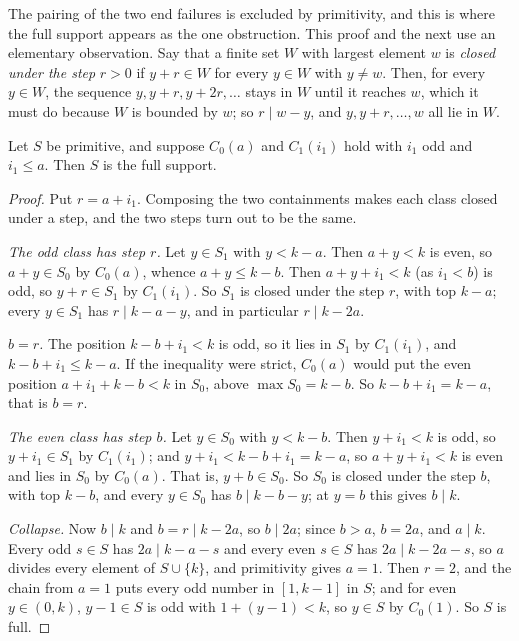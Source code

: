 The pairing of the two end failures is excluded by primitivity, and this is
where the full support appears as the one obstruction. This proof and the
next use an elementary observation. Say that a finite set $W$ with largest
element $w$ is \emph{closed under the step} $r>0$ if $y+r\in W$ for every
$y\in W$ with $y\ne w$. Then, for every $y\in W$, the sequence
$y,y+r,y+2r,\dots$ stays in $W$ until it reaches $w$, which it must do
because $W$ is bounded by $w$; so $r\mid w-y$, and $y,y+r,\dots,w$ all lie in
$W$.

\begin{lemma}
\label{lem:nao-endend}
Let $S$ be primitive, and suppose $C_0(a)$ and $C_1(i_1)$ hold with $i_1$
odd and $i_1\le a$. Then $S$ is the full support.
\end{lemma}

\begin{proof}
Put $r=a+i_1$. Composing the two containments makes each class closed under
a step, and the two steps turn out to be the same.

\emph{The odd class has step $r$.} Let $y\in S_1$ with $y<k-a$. Then $a+y<k$
is even, so $a+y\in S_0$ by $C_0(a)$, whence $a+y\le k-b$. Then
$a+y+i_1<k$ (as $i_1<b$) is odd, so $y+r\in S_1$ by $C_1(i_1)$. So $S_1$
is closed under the step $r$, with top $k-a$; every $y\in S_1$ has
$r\mid k-a-y$, and in particular $r\mid k-2a$.

\emph{$b=r$.} The position $k-b+i_1<k$ is odd, so it lies in $S_1$ by
$C_1(i_1)$, and $k-b+i_1\le k-a$. If the inequality were strict, $C_0(a)$
would put the even position $a+i_1+k-b<k$ in $S_0$, above
$\max S_0=k-b$. So $k-b+i_1=k-a$, that is $b=r$.

\emph{The even class has step $b$.} Let $y\in S_0$ with $y<k-b$. Then
$y+i_1<k$ is odd, so $y+i_1\in S_1$ by $C_1(i_1)$; and
$y+i_1<k-b+i_1=k-a$, so $a+y+i_1<k$ is even and lies in $S_0$ by $C_0(a)$.
That is, $y+b\in S_0$. So $S_0$ is closed under the step $b$, with top
$k-b$, and every $y\in S_0$ has $b\mid k-b-y$; at $y=b$ this gives
$b\mid k$.

\emph{Collapse.} Now $b\mid k$ and $b=r\mid k-2a$, so $b\mid 2a$; since
$b>a$, $b=2a$, and $a\mid k$. Every odd $s\in S$ has $2a\mid k-a-s$ and
every even $s\in S$ has $2a\mid k-2a-s$, so $a$ divides every element of
$S\cup\{k\}$, and primitivity gives $a=1$. Then $r=2$, and the chain from $a=1$
puts every odd number in $[1,k-1]$ in $S$; and for even $y\in(0,k)$,
$y-1\in S$ is odd with $1+(y-1)<k$, so $y\in S$ by $C_0(1)$. So $S$ is full.
\end{proof}

